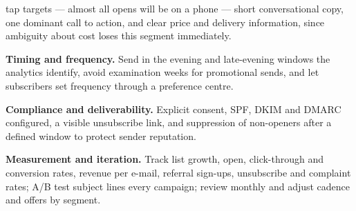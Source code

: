 \begin{qlist}
\begin{apts}
      tap targets --- almost all opens will be on a phone --- short conversational
      copy, one dominant call to action, and clear price and delivery
      information, since ambiguity about cost loses this segment immediately.
\item \textbf{Timing and frequency.} Send in the evening and late-evening
      windows the analytics identify, avoid examination weeks for promotional
      sends, and let subscribers set frequency through a preference centre.
\item \textbf{Compliance and deliverability.} Explicit consent, SPF, DKIM and
      DMARC configured, a visible unsubscribe link, and suppression of
      non-openers after a defined window to protect sender reputation.
\item \textbf{Measurement and iteration.} Track list growth, open, click-through
      and conversion rates, revenue per e-mail, referral sign-ups, unsubscribe
      and complaint rates; A/B test subject lines every campaign; review
      monthly and adjust cadence and offers by segment.
\end{apts}

\end{qlist}
